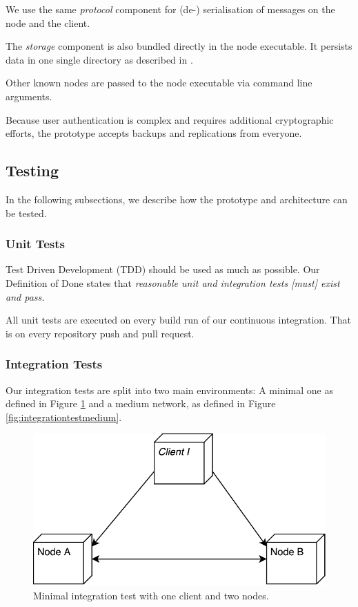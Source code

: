 We use the same \emph{protocol} component for (de-) serialisation of messages on the \gls{node} and the \gls{client}.

The \emph{storage} component is also bundled directly in the \gls{node} executable. It persists data in one single directory as described in .

Other known \glspl{node} are passed to the \gls{node} executable via command line arguments.

Because user authentication is complex and requires additional cryptographic efforts, the prototype accepts backups and replications from everyone.

\subsection{Testing}\label{testing}

In the following subsections, we describe how the prototype and architecture can be tested.

\subsubsection{Unit Tests}\label{unit-tests}
Test Driven Development (TDD) \cite{TDD} should be used as much as possible. Our Definition of Done\cite{project-plan} states that \emph{reasonable unit and integration tests [must] exist and pass.}

All unit tests are executed on every build run of our continuous integration. That is on every repository push and pull request.

\subsubsection{Integration Tests}\label{integration-tests}

Our integration tests are split into two main environments: A minimal one as defined in Figure \ref{fig:integrationtestsmall} and a medium network, as defined in Figure \ref{fig:integrationtestmedium}.

\begin{figure}
	\centering
	\includegraphics[width=0.5\linewidth]{resources/integration_test_small}
	\caption[Minimal integration test]{Minimal integration test with one \gls{client} and two \glspl{node}.}
	\label{fig:integrationtestsmall}
\end{figure}

